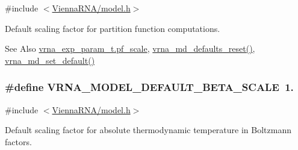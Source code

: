 {\ttfamily \#include $<$\hyperlink{model_8h}{Vienna\-R\-N\-A/model.\-h}$>$}



Default scaling factor for partition function computations. 

\begin{DoxySeeAlso}{See Also}
\hyperlink{group__energy__parameters_a53c12f0d74f94ce371e0471a8ab5a377}{vrna\-\_\-exp\-\_\-param\-\_\-t.\-pf\-\_\-scale}, \hyperlink{group__model__details_ga70834424cf804d149937de89f80ceb45}{vrna\-\_\-md\-\_\-defaults\-\_\-reset()}, \hyperlink{group__model__details_ga8ac6ff84936282436f822644bf841f66}{vrna\-\_\-md\-\_\-set\-\_\-default()} 
\end{DoxySeeAlso}
\hypertarget{group__model__details_ga383d3ac8d08c3b6221754b50871c1200}{
\subsubsection[{V\-R\-N\-A\-\_\-\-M\-O\-D\-E\-L\-\_\-\-D\-E\-F\-A\-U\-L\-T\-\_\-\-B\-E\-T\-A\-\_\-\-S\-C\-A\-L\-E}]{\setlength{\rightskip}{0pt plus 5cm}\#define V\-R\-N\-A\-\_\-\-M\-O\-D\-E\-L\-\_\-\-D\-E\-F\-A\-U\-L\-T\-\_\-\-B\-E\-T\-A\-\_\-\-S\-C\-A\-L\-E~1.}}\label{group__model__details_ga383d3ac8d08c3b6221754b50871c1200}


{\ttfamily \#include $<$\hyperlink{model_8h}{Vienna\-R\-N\-A/model.\-h}$>$}



Default scaling factor for absolute thermodynamic temperature in Boltzmann factors. 

